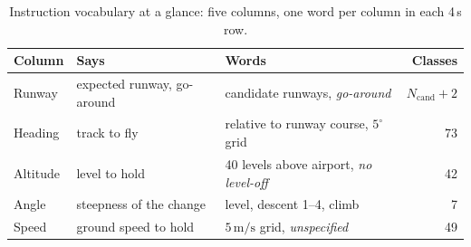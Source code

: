 
\begin{table}[t]
\centering
\caption{Instruction vocabulary at a glance: five columns, one word per column in each 4\,s row.}
\label{tab:vocab-summary}
\small
\renewcommand{\arraystretch}{1.2}
\begin{tabular}{@{}l l l r@{}}
\toprule
Column & Says & Words & Classes \\
\midrule
Runway   & expected runway, go-around & candidate runways, \emph{go-around}           & $N_{\mathrm{cand}}+2$ \\
Heading  & track to fly               & relative to runway course, $5^\circ$ grid       & 73 \\
Altitude & level to hold              & 40 levels above airport, \emph{no level-off}   & 42 \\
Angle    & steepness of the change    & level, descent 1--4, climb                      & 7 \\
Speed    & ground speed to hold       & $5\,\mathrm{m/s}$ grid, \emph{unspecified}     & 49 \\
\bottomrule
\end{tabular}
\end{table}

